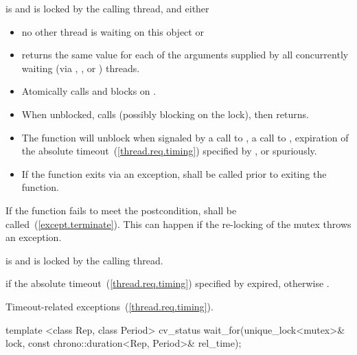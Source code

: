 \begin{itemdescr}
\pnum
\precondition {} is  and 
is locked by the calling thread, and either
\begin{itemize}
\item no other thread is waiting on this  object or
\item {} returns the same value for each of the 
arguments supplied by all concurrently waiting (via ,
, or ) threads.
\end{itemize}

\pnum
\effects
\begin{itemize}
\item
Atomically calls  and blocks on .

\item
When unblocked, calls  (possibly blocking on the lock), then returns.

\item
The function will unblock when signaled by a call to , a call to ,
expiration of the absolute timeout~(\ref{thread.req.timing}) specified by ,
or spuriously.

\item
If the function exits via an exception,  shall be called prior to exiting the function.
\end{itemize}

\pnum
\notes
If the function fails to meet the postcondition, 
shall be called~(\ref{except.terminate}).
\enternote This can happen if the re-locking of the mutex throws an exception. \exitnote

\pnum
\postcondition {} is  and 
is locked by the calling thread.

\pnum
\returns {} if
the absolute timeout~(\ref{thread.req.timing}) specified by  expired,
otherwise .

\pnum\throws Timeout-related
exceptions~(\ref{thread.req.timing}).

\end{itemdescr}

%
%
\begin{itemdecl}
template <class Rep, class Period>
  cv_status wait_for(unique_lock<mutex>& lock,
                     const chrono::duration<Rep, Period>& rel_time);
\end{itemdecl}

